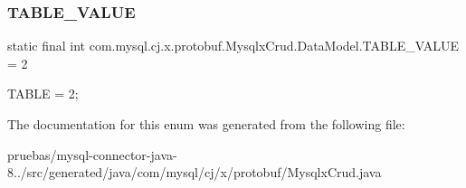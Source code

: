 \subsubsection{\texorpdfstring{T\+A\+B\+L\+E\+\_\+\+V\+A\+L\+UE}{TABLE\_VALUE}}
{\footnotesize\ttfamily  static  final int com.\+mysql.\+cj.\+x.\+protobuf.\+Mysqlx\+Crud.\+Data\+Model.\+T\+A\+B\+L\+E\+\_\+\+V\+A\+L\+UE = 2\hspace{0.3cm}{\ttfamily [static]}}

{\ttfamily T\+A\+B\+LE = 2;} 

The documentation for this enum was generated from the following file\+:\begin{DoxyCompactItemize}
\item 
pruebas/mysql-\/connector-\/java-\/8../src/generated/java/com/mysql/cj/x/protobuf/Mysqlx\+Crud.\+java\end{DoxyCompactItemize}
